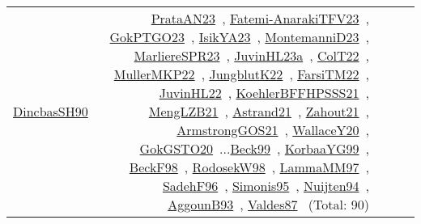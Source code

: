 {\begin{longtable}{p{3cm}r>{\raggedright\arraybackslash}p{6cm}>{\raggedright\arraybackslash}p{6cm}>{\raggedright\arraybackslash}p{8cm}}
\href{../works/DincbasSH90.pdf}{DincbasSH90}~\cite{DincbasSH90} & \href{../works/PrataAN23.pdf}{PrataAN23}~\cite{PrataAN23}, \href{../works/Fatemi-AnarakiTFV23.pdf}{Fatemi-AnarakiTFV23}~\cite{Fatemi-AnarakiTFV23}, \href{../works/GokPTGO23.pdf}{GokPTGO23}~\cite{GokPTGO23}, \href{../works/IsikYA23.pdf}{IsikYA23}~\cite{IsikYA23}, \href{../works/MontemanniD23.pdf}{MontemanniD23}~\cite{MontemanniD23}, \href{../works/MarliereSPR23.pdf}{MarliereSPR23}~\cite{MarliereSPR23}, \href{../works/JuvinHL23a.pdf}{JuvinHL23a}~\cite{JuvinHL23a}, \href{../works/ColT22.pdf}{ColT22}~\cite{ColT22}, \href{../works/MullerMKP22.pdf}{MullerMKP22}~\cite{MullerMKP22}, \href{../works/JungblutK22.pdf}{JungblutK22}~\cite{JungblutK22}, \href{../works/FarsiTM22.pdf}{FarsiTM22}~\cite{FarsiTM22}, \href{../works/JuvinHL22.pdf}{JuvinHL22}~\cite{JuvinHL22}, \href{../works/KoehlerBFFHPSSS21.pdf}{KoehlerBFFHPSSS21}~\cite{KoehlerBFFHPSSS21}, \href{../works/MengLZB21.pdf}{MengLZB21}~\cite{MengLZB21}, \href{../works/Astrand21.pdf}{Astrand21}~\cite{Astrand21}, \href{../works/Zahout21.pdf}{Zahout21}~\cite{Zahout21}, \href{../works/ArmstrongGOS21.pdf}{ArmstrongGOS21}~\cite{ArmstrongGOS21}, \href{../works/WallaceY20.pdf}{WallaceY20}~\cite{WallaceY20}, \href{../works/GokGSTO20.pdf}{GokGSTO20}~\cite{GokGSTO20}...\href{../works/Beck99.pdf}{Beck99}~\cite{Beck99}, \href{../works/KorbaaYG99.pdf}{KorbaaYG99}~\cite{KorbaaYG99}, \href{../works/BeckF98.pdf}{BeckF98}~\cite{BeckF98}, \href{../works/RodosekW98.pdf}{RodosekW98}~\cite{RodosekW98}, \href{../works/LammaMM97.pdf}{LammaMM97}~\cite{LammaMM97}, \href{../works/SadehF96.pdf}{SadehF96}~\cite{SadehF96}, \href{../works/Simonis95.pdf}{Simonis95}~\cite{Simonis95}, \href{../works/Nuijten94.pdf}{Nuijten94}~\cite{Nuijten94}, \href{../works/AggounB93.pdf}{AggounB93}~\cite{AggounB93}, \href{../works/Valdes87.pdf}{Valdes87}~\cite{Valdes87} (Total: 90)\\

\end{longtable}}
